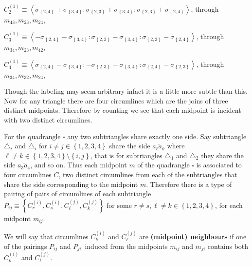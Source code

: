 \documentclass[11pt]{article}
\begin{document}
$C_{2}^{\left( 1\right) }\equiv \left\langle \sigma _{\left\{ 2,4\right\}
}+\sigma _{\left\{ 3,4\right\} }:\sigma _{\left\{ 2,3\right\} }+\sigma
_{\left\{ 3,4\right\} }:\sigma _{\left\{ 2,3\right\} }+\sigma _{\left\{
2,4\right\} }\right\rangle $, through $m_{43},m_{23},m_{24}$,

$C_{3}^{\left( 1\right) }\equiv \left\langle -\sigma _{\left\{ 2,4\right\}
}-\sigma _{\left\{ 3,4\right\} }:\sigma _{\left\{ 2,3\right\} }-\sigma
_{\left\{ 3,4\right\} }:\sigma _{\left\{ 2,3\right\} }-\sigma _{\left\{
2,4\right\} }\right\rangle $, through $m_{34},m_{23},m_{42}$,

$C_{4}^{\left( 1\right) }\equiv \left\langle \sigma _{\left\{ 2,4\right\}
}-\sigma _{\left\{ 3,4\right\} }:-\sigma _{\left\{ 2,3\right\} }-\sigma
_{\left\{ 3,4\right\} }:\sigma _{\left\{ 2,4\right\} }-\sigma _{\left\{
2,3\right\} }\right\rangle $, through $m_{34},m_{32},m_{24}$,

\bigskip

Though the labeling may seem arbitrary infact it is a little more subtle
than this. Now for any triangle there are four circumlines which are the
joins of three distinct midpoints. Therefore by counting we see that each
midpoint is incident with two distinct circumlines.

For the quadrangle $\square $ any two subtriangles share exactly one side.
Say subtriangle $\triangle _{i}$ and $\triangle _{i}$ for $i\neq j\in
\left\{ 1,2,3,4\right\} $ share the side $\overline{a_{\ell }a_{k}}$ where $%
\ell \neq k\in \left\{ 1,2,3,4\right\} \setminus \left\{ i,j\right\} $, that
is for subtriangles $\triangle _{1}$ and $\triangle _{2}$ they share the
side $\overline{a_{3}a_{4}}$, and so on. Thus each midpoint $m$ of the
quadrangle $\square $ is associated to four circumlines $C$, two distinct
circumlines from each of the subtriangles that share the side corresponding
to the midpoint $m$. Therefore there is a type of pairing of pairs of
circumlines of each subtriangle $P_{ij}\equiv \left\{ C_{r}^{\left( i\right)
},C_{s}^{\left( i\right) },C_{\ell }^{\left( j\right) },C_{k}^{\left(
j\right) }\right\} $ for some $r\neq s,\ell \neq k\in \left\{
1,2,3,4\right\} $, for each midpoint $m_{ij}$.

We will say that circumlines $C_{k}^{\left( i\right) }$ and $C_{\ell
}^{\left( j\right) }$ are \textbf{(midpoint) neighbours} if one of the
pairings $P_{ij}$ and $P_{ji}$\ induced from the midpoints $m_{ij}$ and $%
m_{ji}$ contains both $C_{k}^{\left( i\right) }$ and $C_{\ell }^{\left(
j\right) }$.
\end{document}
